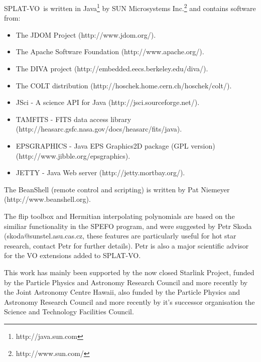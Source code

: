 \documentclass[twoside,11pt]{article}
\newcommand{\htmladdnormallinkfoot}[2]{#1\footnote{#2}}
\newcommand{\htmladdnormallink}[2]{#1}
\renewcommand{\_}{\texttt{\symbol{95}}}
\newcommand{\SPLAT}{\textsf{SPLAT-VO}}
\begin{document}
\SPLAT\ is written in
\htmladdnormallinkfoot{Java}{http://java.sun.com} by
\htmladdnormallinkfoot{SUN Microsystems Inc.}{http://www.sun.com/} and
contains software from:
\begin{itemize}
\item The JDOM Project (\htmladdnormallink{http://www.jdom.org/}
                                          {http://www.jdom.org/}).
\item The Apache Software Foundation
      (\htmladdnormallink{http://www.apache.org/}
                         {http://www.apache.org/}).
\item The DIVA project
      (\htmladdnormallink{http://embedded.eecs.berkeley.edu/diva/}
                         {http://embedded.eecs.berkeley.edu/diva/}).
\item The COLT distribution
      (\htmladdnormallink{http://hoschek.home.cern.ch/hoschek/colt/}
                         {http://hoschek.home.cern.ch/hoschek/colt/}).
\item JSci - A science API for Java
      (\htmladdnormallink{http://jsci.sourceforge.net/}
                         {http://jsci.sourceforge.net/}).
\item TAMFITS - FITS data access library
      (\htmladdnormallink{http://heasarc.gsfc.nasa.gov/docs/heasarc/fits/java}
                         {http://heasarc.gsfc.nasa.gov/docs/heasarc/fits/java}).
\item EPSGRAPHICS - Java EPS Graphics2D package (GPL version)
      (\htmladdnormallink{http://www.jibble.org/epsgraphics}
                         {http://www.jibble.org/epsgraphics}).
\item JETTY - Java Web server
      (\htmladdnormallink{http://jetty.mortbay.org/}
                         {http://jetty.mortbay.org/}).
\end{itemize}

The BeanShell (remote control and scripting) is written by Pat
Niemeyer (\htmladdnormallink{http://www.beanshell.org}
                            {http://www.beanshell.org}).

The flip toolbox and Hermitian interpolating polynomials are based on the
similiar functionality in the SPEFO program, and were suggested by Petr Skoda
(skoda@sunstel.asu.cas.cz, these features are particularly useful for hot star
research, contact Petr for further details). Petr is also a major scientific
advisor for the VO extensions added to \SPLAT.

This work has mainly been supported by the now closed
\htmladdnormallink{Starlink Project}{http://www.starlink.ac.uk},
funded by the
\htmladdnormallink{Particle Physics and Astronomy Research Council}{http://www.pparc.ac.uk}
and more recently by the
\htmladdnormallink{Joint Astronomy Centre Hawaii}{http://www.jach.hawaii.edu},
also funded by the
\htmladdnormallink{Particle Physics and Astronomy Research Council}{http://www.pparc.ac.uk}
and more recently by it's successor organisation the
\htmladdnormallink{Science and Technology Facilities Council}{http://www.scitech.ac.uk}.
\end{document}
